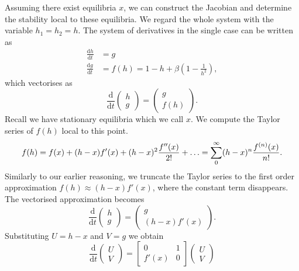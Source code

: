 Assuming there exist equilibria \(x\), 
we can construct the Jacobian and determine the stability local to these equilibria.
We regard the whole system with the variable \(h_1=h_2=h\).
The system of derivatives in the single case can be written as
\begin{equation}
    \begin{aligned}
        \frac{\mathrm{d}h}{\mathrm{d}t} &= g \\
        \frac{\mathrm{d}g}{\mathrm{d}t} &= f(h) = 1-h +\beta\left(1-\frac{1}{h^2}\right),
    \end{aligned}
\end{equation}
which vectorises as
\begin{equation}
    \frac{\mathrm{d}}{\mathrm{d}t} \begin{pmatrix}
        h \\
        g
    \end{pmatrix} = \begin{pmatrix}
        g \\
        f(h)
    \end{pmatrix}.
\end{equation}
Recall we have stationary equilibria which we call \(x\). We compute the Taylor series of \(f(h)\) local to this point.
\begin{equation}
    f(h) = f(x) + (h-x)f'(x) + (h-x)^2\frac{f''(x)}{2!} + \mathellipsis =\sum_{0}^{\infty} (h-x)^n\frac{f^{(n)}(x)}{n!}.
\end{equation}
Similarly to our earlier reasoning, we truncate the Taylor series to the first order approximation $f(h) \approx (h-x)f'(x)$,
where the constant term disappears.
The vectorised approximation becomes
\begin{equation}
    \frac{\mathrm{d}}{\mathrm{d}t}\begin{pmatrix}
        h \\
        g
    \end{pmatrix} = \begin{pmatrix}
        g \\
        (h-x)f'(x)
    \end{pmatrix}.
\end{equation}
Substituting \(U = h-x\) and \(V = g\) we obtain
\begin{equation}
    \frac{\mathrm{d}}{\mathrm{d}t} \begin{pmatrix}
        U \\
        V
    \end{pmatrix} = \begin{bmatrix}
        0 & 1 \\
        f'(x) & 0
    \end{bmatrix} \begin{pmatrix}
        U \\
        V
    \end{pmatrix} 
\end{equation}
